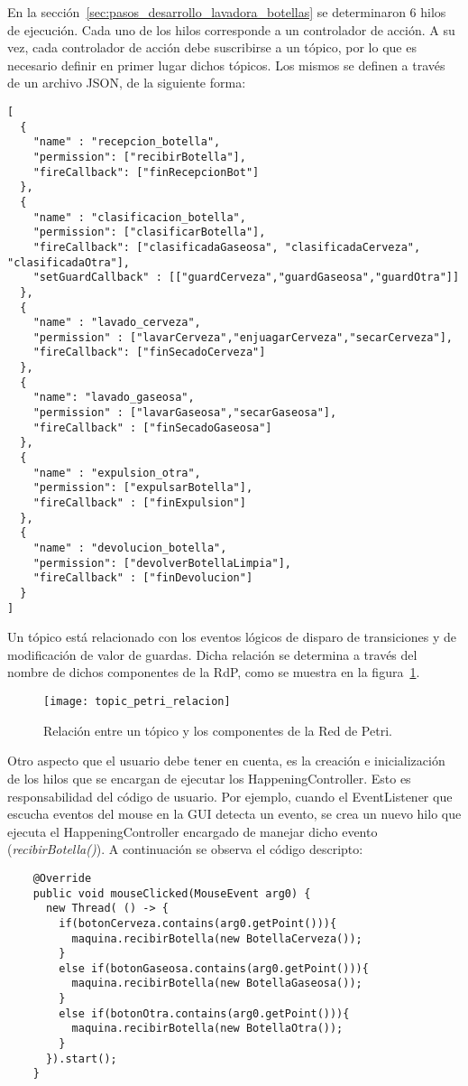 En la sección~\ref{sec:pasos_desarrollo_lavadora_botellas} se determinaron 6
hilos de ejecución. Cada uno de los hilos corresponde a un controlador de
acción. A su vez, cada controlador de acción debe suscribirse a
un tópico, por lo que es necesario definir en primer lugar dichos tópicos. Los
mismos se definen a través de un archivo JSON, de la siguiente forma:\\
\begin{verbatim}
[
  {
    "name" : "recepcion_botella",
    "permission": ["recibirBotella"],
    "fireCallback": ["finRecepcionBot"]
  },
  {
    "name" : "clasificacion_botella",
    "permission": ["clasificarBotella"],
    "fireCallback": ["clasificadaGaseosa", "clasificadaCerveza", "clasificadaOtra"],
    "setGuardCallback" : [["guardCerveza","guardGaseosa","guardOtra"]]
  },
  {
    "name" : "lavado_cerveza",
    "permission" : ["lavarCerveza","enjuagarCerveza","secarCerveza"],
    "fireCallback": ["finSecadoCerveza"]
  },
  {
    "name": "lavado_gaseosa",
    "permission" : ["lavarGaseosa","secarGaseosa"],
    "fireCallback" : ["finSecadoGaseosa"]
  },
  {
    "name" : "expulsion_otra",
    "permission": ["expulsarBotella"],
    "fireCallback" : ["finExpulsion"]
  },
  {
    "name" : "devolucion_botella",
    "permission": ["devolverBotellaLimpia"],
    "fireCallback" : ["finDevolucion"]
  }
]
\end{verbatim}

Un tópico está relacionado con los eventos lógicos de
disparo de transiciones y de modificación de valor de guardas. Dicha relación
se determina a través del nombre de dichos componentes de la RdP, como
se muestra en la figura~\ref{fig:topic_petri_relacion}.

\begin{figure}[H]
    \centering
    \texttt{[image: topic\_petri\_relacion]}
    \caption{Relación entre un tópico y los componentes de la Red de Petri.}
    \label{fig:topic_petri_relacion}
\end{figure}

Otro aspecto que el usuario debe tener en cuenta, es la
creación e inicialización de los hilos que se encargan de ejecutar los
HappeningController. Esto es responsabilidad del código de usuario. Por
ejemplo, cuando el EventListener que escucha eventos del mouse en la GUI
detecta un evento, se crea un nuevo hilo que ejecuta el HappeningController
encargado de manejar dicho evento (\emph{recibirBotella()}). A
continuación se observa el código descripto:

\begin{verbatim}
    @Override
    public void mouseClicked(MouseEvent arg0) {
      new Thread( () -> {
        if(botonCerveza.contains(arg0.getPoint())){
          maquina.recibirBotella(new BotellaCerveza());
        }
        else if(botonGaseosa.contains(arg0.getPoint())){
          maquina.recibirBotella(new BotellaGaseosa());
        }
        else if(botonOtra.contains(arg0.getPoint())){
          maquina.recibirBotella(new BotellaOtra());
        }
      }).start();
    }
\end{verbatim}


